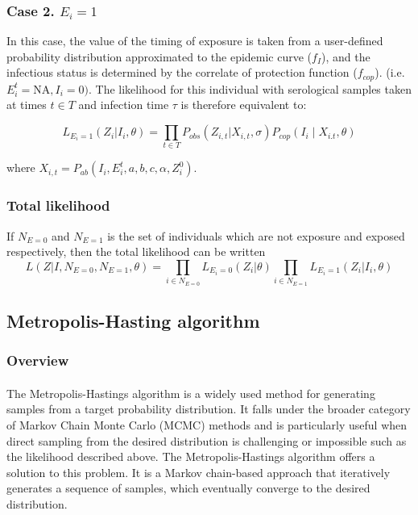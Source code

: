 \documentclass{article}
\begin{document}
\subsubsection{Case 2. $E_i = 1$}
In this case, the value of the timing of exposure is taken from a user-defined probability distribution approximated to the epidemic curve ($f_I$), and the infectious status is determined by the correlate of protection function ($f_{cop}$). (i.e. $E^t_i = \text{NA}, I_i = 0)$. The likelihood for this individual with serological samples taken at times $t\in T$ and infection time $\tau$ is therefore equivalent to:

\begin{equation}
L_{E_i = 1}(Z_{i}| I_i, \theta) = \prod_{t \in T}P_{obs}(Z_{i,t}|X_{i,t}, \sigma)P_{cop}(I_i \mid  X_{i.t}, \theta)
\end{equation}

where $X_{i,t} =P_{ab}( I_i,  E_i^t, a, b, c, \alpha, Z^0_i) $.


\subsubsection{Total likelihood}
If $N_{E=0}$ and $N_{E = 1}$ is the set of individuals which are not exposure and exposed respectively, then the total likelihood can be written 
\begin{equation}
L(Z|I, N_{E=0}, N_{E=1}, \theta) = \prod_{i \in N_{E=0}}L_{E_i = 0}(Z_{i}| \theta) \prod_{i \in N_{E=1}}L_{E_i = 1}(Z_{i}| I_i, \theta) 
\end{equation}

\subsection{Metropolis-Hasting algorithm}

\subsubsection{Overview}
\paragraph{} The Metropolis-Hastings algorithm is a widely used method for generating samples from a target probability distribution. It falls under the broader category of Markov Chain Monte Carlo (MCMC) methods and is particularly useful when direct sampling from the desired distribution is challenging or impossible such as the likelihood described above. The Metropolis-Hastings algorithm offers a solution to this problem. It is a Markov chain-based approach that iteratively generates a sequence of samples, which eventually converge to the desired distribution. 
\end{document}
